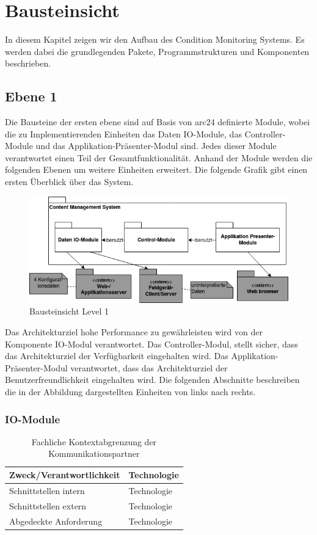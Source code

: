 \chapter{Bausteinsicht}
In diesem Kapitel zeigen wir den Aufbau des Condition Monitoring Systems. Es werden dabei die grundlegenden Pakete, Programmstrukturen und Komponenten beschrieben.
\section{Ebene 1}
Die Bausteine der ersten ebene sind auf Basis von arc24 definierte Module, wobei die zu Implementierenden Einheiten das Daten IO-Module, das Controller-Module und das Applikation-Präsenter-Modul sind. Jedes dieser Module verantwortet einen Teil der Gesamtfunktionalität. Anhand der Module werden die folgenden Ebenen um weitere Einheiten erweitert. Die folgende Grafik gibt einen ersten Überblick über das System.
\begin{figure}[h]
	\centering
	\includegraphics[width=1.0\textwidth]{Graphics/bausteinansicht_ebene_1.png}
	\caption{Bausteinsicht Level 1}
	\label{fig:bausteinsichtlvl1}
\end{figure}
Das Architekturziel hohe Performance zu gewährleisten wird von der Komponente IO-Modul verantwortet.
Das Controller-Modul, stellt sicher, dass das Architekturziel der Verfügbarkeit eingehalten wird. 
Das Applikation-Präsenter-Modul verantwortet, dass das Architekturziel der Benutzerfreundlichkeit eingehalten wird.
Die folgenden Abschnitte beschreiben die in der Abbildung dargestellten Einheiten von links nach rechts.  
\subsection{IO-Module}
\begin{table}[th]
	\begin{tabularx}{\textwidth}{X X}
		\hline
		 Zweck/Verantwortlichkeit & Technologie \\
		 \hline
		 Schnittstellen intern & Technologie \\
		 \hline
		 Schnittstellen extern & Technologie \\
		 \hline
		 Abgedeckte Anforderung & Technologie \\
		\hline
	\end{tabularx} 
	\caption{Fachliche Kontextabgrenzung der Kommunikationspartner}
	\label{tab:FachlicheKontextabgrenzungDerKommunikationspartner}
\end{table}

